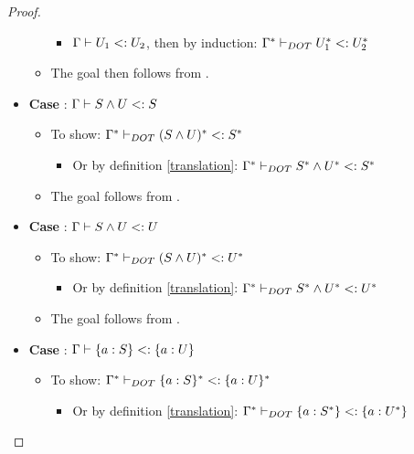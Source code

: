 \begin{proof}
\begin{itemize}
\begin{itemize}
\begin{itemize}
                \item $\Gamma \vdash U_1 <: U_2$, then by induction:
                    $\Gamma^{*} \vdash_{DOT} U_1^{*} <: U_2^{*}$
            \end{itemize}
            \item The goal then follows from .
        \end{itemize}
        \item \textbf{Case} : $\Gamma \vdash S \wedge U <: S$
        \begin{itemize}
            \item To show:
                $\Gamma^{*} \vdash_{DOT} (S \wedge U)^{*} <: S^{*}$
            \begin{itemize}
                \item Or by definition \ref{translation}: $\Gamma^{*} \vdash_{DOT} S^{*} \wedge U^{*} <: S^{*}$
            \end{itemize}
            \item The goal follows from .
        \end{itemize}
        \item \textbf{Case} : $\Gamma \vdash S \wedge U <: U$
        \begin{itemize}
            \item To show:
                $\Gamma^{*} \vdash_{DOT} (S \wedge U)^{*} <: U^{*}$
            \begin{itemize}
                \item Or by definition \ref{translation}: $\Gamma^{*} \vdash_{DOT} S^{*} \wedge U^{*} <: U^{*}$
            \end{itemize}
            \item The goal follows from .
        \end{itemize}
        \item \textbf{Case} :
            $\Gamma \vdash \{a : S\} <: \{a : U\}$
        \begin{itemize}
            \item To show:
                $\Gamma^{*} \vdash_{DOT} \{a : S\}^{*} <: \{a : U\}^{*}$
            \begin{itemize}
                \item Or by definition \ref{translation}:
                    $\Gamma^{*} \vdash_{DOT} \{a : S^{*}\} <: \{a : U^{*}\}$

\end{itemize}
\end{itemize}
\end{itemize}
\end{proof}
